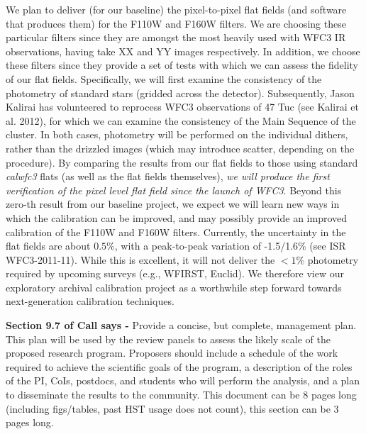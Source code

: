 \documentclass[12pt]{article}
\begin{document}
We plan to deliver (for our baseline) the pixel-to-pixel flat
fields (and software that produces them) for the F110W and F160W
filters.  We are choosing these particular filters since they are
amongst the most heavily used with WFC3 IR observations, having take
XX and YY images respectively.  In addition, we choose these filters
since they provide a set of tests with which we can assess the
fidelity of our flat fields.  Specifically, we will first examine the
consistency of the photometry of standard stars (gridded across 
the detector).  Subsequently, Jason Kalirai has volunteered to
reprocess WFC3 observations of 47 Tuc (see Kalirai et al. 2012), for
which we can examine the consistency of the Main Sequence of the
cluster.  In both cases, photometry will be performed on the
individual dithers, rather than the drizzled images (which may
introduce scatter, depending on the procedure).  By comparing the
results from our flat fields to those using standard \emph{calwfc3}
flats (as well as the flat fields themselves), \emph{we will produce
  the first verification of the pixel level flat field since the
  launch of WFC3}.  Beyond this zero-th result from our baseline
project, we expect we will learn new ways in which the calibration can
be improved, and may possibly provide an improved calibration of the
F110W and F160W filters.  Currently, the uncertainty in the flat
fields are about $0.5\%$, with a peak-to-peak variation of -1.5/1.6\%
(see ISR WFC3-2011-11).  While this is excellent, it will not deliver
the $<1\%$ photometry required by upcoming surveys (e.g., WFIRST,
Euclid).  We therefore view our exploratory archival calibration
project as a worthwhile step forward towards next-generation
calibration techniques.


%
%
\budgetnarrative       %

\textbf{Section 9.7 of Call says -} Provide a concise, but complete, 
management plan. This plan will be used by the review panels to assess 
the likely scale of the proposed research program. Proposers should 
include a schedule of the work required to achieve the scientific
goals of the program, a description of the roles of the PI, CoIs,
postdocs, and students who will perform the analysis, and a plan to 
disseminate the results to the community.  This document can be 8 
pages long (including figs/tables, past HST usage does not count),
this section can be 3 pages long.
\end{document}
